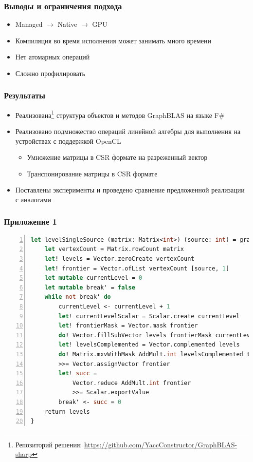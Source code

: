 \documentclass{beamer}
\begin{document}
\begin{frame}  
  \frametitle{Выводы и ограничения подхода}
  \begin{itemize}
    \item Managed $\longrightarrow$ Native $\longrightarrow$ GPU 
    \item Компиляция во время исполнения может занимать много времени
    \item Нет атомарных операций
    \item Сложно профилировать
  \end{itemize}
\end{frame}
             
\begin{frame}  
  \frametitle{Результаты}
  \begin{itemize}
    \item Реализована\footnote{Репозиторий решения: \url{https://github.com/YaccConstructor/GraphBLAS-sharp}} структура объектов и методов GraphBLAS на языке F\#
    \item Реализовано подмножество операций линейной алгебры для выполнения на устройствах с поддержкой OpenCL
    \begin{itemize}
      \item Умножение матрицы в CSR формате на разреженный вектор
      \item Транспонирование матрицы в CSR формате
    \end{itemize}
    \item Поставлены эксперименты и проведено сравнение предложенной реализации с аналогами
  \end{itemize}
\end{frame}         

\appendix

\begin{frame}[fragile]
  \frametitle{Приложение 1}
  \begin{lstlisting}[language=ml, caption=Реализация поиска в ширину в GraphBLAS-sharp, basicstyle=\tiny, numbers=left, numberstyle={\tiny \color{black}}, xleftmargin=5.0ex]
let levelSingleSource (matrix: Matrix<int>) (source: int) = graphblas {
    let vertexCount = Matrix.rowCount matrix
    let! levels = Vector.zeroCreate vertexCount
    let! frontier = Vector.ofList vertexCount [source, 1]
    let mutable currentLevel = 0
    let mutable break' = false
    while not break' do
        currentLevel <- currentLevel + 1
        let! currentLevelScalar = Scalar.create currentLevel
        let! frontierMask = Vector.mask frontier
        do! Vector.fillSubVector levels frontierMask currentLevelScalar
        let! levelsComplemented = Vector.complemented levels
        do! Matrix.mxvWithMask AddMult.int levelsComplemented transposed frontier
        >>= Vector.assignVector frontier
        let! succ =
            Vector.reduce AddMult.int frontier
            >>= Scalar.exportValue
        break' <- succ = 0
    return levels
}
  \end{lstlisting}
\end{frame}
\end{document}
